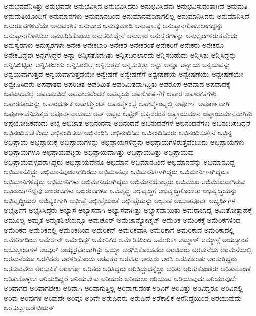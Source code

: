 {ಅನುಭವವೆನಿಸಿತ್ತು
ಅನುಭವವೇ
ಅನುಭವಿಸಿದ
ಅನುಭವಿಸಿದರು
ಅನುಭವಿಸಿದೆವು
ಅನುಭವಿಸುವಂತಾಗಿದೆ
ಅನುಮತಿ
ಅನುಮತಿಯೊಂದಿಗೆ
ಅನುಮಾನಗಳು
ಅನುಮಾನದಿಂದ
ಅನುಮಾನವುಂಟಾಗಲಿಲ್ಲ
ಅನುಮಾನಿಸಿದರು
ಅನುಮಾನಿಸಿದೆ
ಅನುರೂಪಗಳಿವೆಯೇ
ಅನುವಂಶಿಕ
ಅನುವಾದ
ಅನುವುಮಾಡಿ
ಅನುಷ್ಠಾನಕ್ಕೆ
ಅನುಷ್ಠಾನಗೊಳಿಸಲಾಗದ್ದನ್ನು
ಅನುಷ್ಠಾನಗೊಳಿಸಲು
ಅನುಸರಿಸಿಕೊಂಡು
ಅನುಸರಿಸಿದ್ದೇನೆ
ಅನುಸಾರ
ಅನುಸ್ವರಗಳನ್ನು
ಅನುಸ್ವರಗಳಿರುತ್ತವೆಂದು
ಅನುಸ್ವರಗಳು
ಅನುಸ್ವರಗಳೇ
ಅನೇಕ
ಅನೇಕಬಾರಿ
ಅನೇಕರ
ಅನೇಕರಂತೆ
ಅನೇಕರಿಗೆ
ಅನೇಕರು
ಅನೇಕರೂ
ಅನೇಕವಿದ್ದವು
ಅನ್ನಗಳಿದ್ದರೆ
ಅನ್ನಾ
ಅನ್ನಿಸತೊಡಗಿತು
ಅನ್ನಿಸದಿರಲಾರದು
ಅನ್ನಿಸಬಹುದು
ಅನ್ನಿಸಿತು
ಅನ್ನಿಸಿದ್ದನ್ನು
ಅನ್ನಿಸಿಬಿಟ್ಟಿತ್ತು
ಅನ್ನಿಸಿರಬೇಕು
ಅನ್ನಿಸಿರಲಿಲ್ಲ
ಅನ್ನಿಸುತ್ತದೆ
ಅನ್ನಿಸುತ್ತಿತ್ತು
ಅನ್ನು
ಅನ್ನೂ
ಅನ್ಯಾಯ
ಅನ್ವಯವನ್ನು
ಅನ್ವಯವಾಗುತ್ತದೆ
ಅನ್ವಯವಾಗುತ್ತದೆಯೇ
ಅನ್ವೇಷಣೆ
ಅನ್ವೇಷಣೆಗೆ
ಅನ್ವೇಷಣೆಯ
ಅನ್ವೇಷಣೆಯು
ಅನ್ವೇಷಣೆಯೇ
ಅನ್ವೇಷಿಸಿದರು
ಅಪಘಾತದ
ಅಪರಿಚಿತ
ಅಪರಿಮಿತ
ಅಪರಿಮಿತವಾಗಿದ್ದಿತು
ಅಪರೂಪ
ಅಪವಾದ
ಅಪವಾದಕ್ಕೆ
ಅಪವಾದವಲ್ಲ
ಅಪವಾದವಿದೆ
ಅಪವಾದವೆಂದರೆ
ಅಪವ್ಯಯ
ಅಪಶೋಷಣೆಗೆ
ಅಪಾರ
ಅಪಾರಕತೆಗಳು
ಅಪಾರಕತೆಯನ್ನು
ಅಪಾರದರ್ಶಕ
ಅಪಾರ್ಟ್ಮೆಂಟ್
ಅಪಾರ್ಟ್ಮೆಂಟ್ಗೆ
ಅಪಾರ್ಟ್ಮೆಂಟ್ನಲ್ಲಿ
ಅಪೂರ್ಣ
ಅಪೂರ್ಣವಾಗಿ
ಅಪೂರ್ಣವೆನಿಸುತ್ತದೆ
ಅಪೂರ್ವವಾದುದು
ಅಪ್
ಅಪ್ಪಟ
ಅಪ್ಪರ್
ಅಪ್ಪಿದರಂತೆ
ಅಪ್ಯಾಯಮಾನ
ಅಪ್ಯಾಯಮಾನವಾಗಿತ್ತು
ಅಪ್ರಯೋಜಕವೆಂದು
ಅಬ್ಬೆ
ಅಭಿಜಾತ
ಅಭಿನಂದನಾ
ಅಭಿನಂದನೆ
ಅಭಿನಂದನೆಗಳ
ಅಭಿನಂದನೆಗಳು
ಅಭಿನಂದಿಸದಿದ್ದರೆ
ಅಭಿನಂದಿಸಬೇಕೆಂದು
ಅಭಿನಂದಿಸಲು
ಅಭಿನಂದಿಸಿ
ಅಭಿನಂದಿಸಿದ
ಅಭಿನಂದಿಸಿದರು
ಅಭಿನಂದಿಸುತ್ತೇನೆ
ಅಭಿನ್ನ
ಅಭಿಪ್ರಾಯ
ಅಭಿಪ್ರಾಯಕ್ಕೆ
ಅಭಿಪ್ರಾಯಗಳನ್ನು
ಅಭಿಪ್ರಾಯಗಳಿದ್ದವು
ಅಭಿಪ್ರಾಯಗಳಿರುತ್ತವೆಂಬುದು
ಅಭಿಪ್ರಾಯಗಳು
ಅಭಿಪ್ರಾಯಗಳೂ
ಅಭಿಪ್ರಾಯಪಟ್ಟರು
ಅಭಿಪ್ರಾಯವಾಗಿತ್ತು
ಅಭಿಪ್ರಾಯವಿತ್ತು
ಅಭಿಪ್ರಾಯವು
ಅಭಿಪ್ರಾಯವುಳ್ಳವರಾಗಿದ್ದರು
ಅಭಿಪ್ರಾಯವೇನೂ
ಅಭಿಮಾನ
ಅಭಿಮಾನದಿಂದ
ಅಭಿಮಾನವನ್ನು
ಅಭಿಮಾನವಿದ್ದ
ಅಭಿಮಾನವಿದ್ದು
ಅಭಿಮಾನವುಂಟಾಗದಿರದು
ಅಭಿಮಾನವೂ
ಅಭಿಮಾನಿಗಳಾಗಿದ್ದರು
ಅಭಿಮಾನಿಗಳಾಗಿದ್ದರೂ
ಅಭಿಮಾನಿಗಳಿದ್ದರು
ಅಭಿಮಾನಿಗಳು
ಅಭಿಮಾನಿಯಾಗಿದ್ದರು
ಅಭಿಮಾನಿಯೊಬ್ಬರು
ಅಭಿಮುಖ
ಅಭಿಮುಖವಾಗಿರುವ
ಅಭಿರುಚಿಗಳಿದ್ದವು
ಅಭಿರುಚಿಗಳು
ಅಭಿರುಚಿಗಳೂ
ಅಭಿವೃದ್ಧಿ
ಅಭಿವೃದ್ಧಿಗೆ
ಅಭಿವೃದ್ಧಿಗೊಂಡಿತು
ಅಭಿವೃದ್ಧಿಯನ್ನು
ಅಭಿವೃದ್ಧಿಯಲ್ಲಿ
ಅಭಿವ್ಯಕ್ತಿಗಾಗಿ
ಅಭೀಪ್ಸೆ
ಅಭೀಪ್ಸೆಯಂತೆ
ಅಭೀಪ್ಸೆಯನ್ನು
ಅಭೂತ
ಅಭೂತಪೂರ್ವ
ಅಭ್ಯರ್ಥಿಗಳ
ಅಭ್ಯರ್ಥಿಗೆ
ಅಭ್ಯಸಿಸಿದ್ದರು
ಅಭ್ಯಾಸ
ಅಭ್ಯಾಸವಾಗಿ
ಅಭ್ಯಾಸವಾಗಿತ್ತು
ಅಭ್ಯಾಸವಾಯಿತು
ಅಮರಾಬಾದ್ನ
ಅಮಿತೋತ್ಸಾಹಕ್ಕೆ
ಅಮೂಲ್ಯ
ಅಮೃತ
ಅಮೃತಶಿಲೆಯನ್ನೂ
ಅಮೆಚೂರ್
ಅಮೆಜಾನ್ಯೋಟೈಟ್
ಅಮೆರಿಕ
ಅಮೆರಿಕಕ್ಕೆ
ಅಮೆರಿಕಗಳಿಂದ
ಅಮೆರಿಕದ
ಅಮೆರಿಕದಲ್ಲಿ
ಅಮೆರಿಕದಿಂದ
ಅಮೆರಿಕನ್
ಅಮೆರಿಕವಾಸಿ
ಅಮೆರಿಕಾಗೆ
ಅಮೆರಿಕಾದ
ಅಮೆರಿಕಾದಲ್ಲಿ
ಅಮೆರಿಕಾದಿಂದ
ಅಮೆಲೀನ್
ಅಮೇಥಿಸ್ಟ್
ಅಮೇರಿಕದ
ಅಮೇರಿಕದಿಂದ
ಅಮೇರಿಕಾ
ಅಮ್ಮಾಳ್
ಅಮ್ಮಾಳ್ಗೆ
ಅಯಸ್ಕಾಂತ
ಅಯಸ್ಕಾಂತಗಳ
ಅಯ್ಯರ್
ಅಯ್ಯರ್ರವರದಾಗಿತ್ತು
ಅಯ್ಯಾ
ಅರಗಿಸಿಕೊಂಡವರು
ಅರಚಿದರು
ಅರಮನೆಯ
ಅರಮನೆಯಲ್ಲಿ
ಅರಮನೆಯೂ
ಅರಳಿದರು
ಅರಳಿಸಿಕೊಂಡು
ಅರವತ್ತರ
ಅರವತ್ತು
ಅರಸರು
ಅರಸಿ
ಅರಸಿಕೊಂಡು
ಅರಸುತ್ತಿದ್ದರು
ಅರಸುವವರು
ಅರಸುವಿಕೆ
ಅರಾಗೋ
ಅರಿತರು
ಅರಿತಿದ್ದರು
ಅರಿತಿದ್ದುದನ್ನೆಲ್ಲಾ
ಅರಿತು
ಅರಿತುಕೊಂಡರು
ಅರಿತುಕೊಂಡೆ
ಅರಿತುಕೊಳ್ಳಲು
ಅರಿಯದಿದ್ದರೆ
ಅರಿಯಬೇಕು
ಅರಿಯರು
ಅರಿಯಲು
ಅರಿಯುವ
ಅರಿಯುವುದು
ಅರಿಯುವುದೇ
ಅರಿವಾಗದ
ಅರಿವಾಗಬೇಕು
ಅರಿವಾಗಿ
ಅರಿವಾಗುತ್ತಿಲ್ಲ
ಅರಿವಾಗುವಂತೆ
ಅರಿವಿಗೆ
ಅರಿವಿತ್ತು
ಅರಿವಿದ್ದರೂ
ಅರಿವಿನಲ್ಲಿ
ಅರಿವು
ಅರಿವುಗಳ
ಅರಿವುದೇ
ಅರಿವೂ
ಅರಿವೇ
ಅರುಹಿದರು
ಅರುಹಿದೆ
ಅರೆಕಾಲಿಕ
ಅರೆನಿದ್ದೆಯಿಂದ
ಅರೆಯುವುದು
ಅರೆಸುಟ್ಟ
ಅರೇಬಿಯನ್
}
